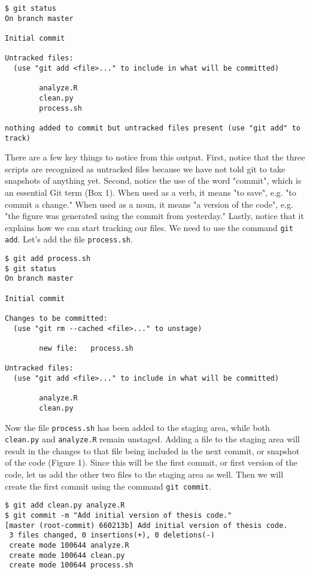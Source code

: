 \begin{lstlisting}
$ git status
On branch master

Initial commit

Untracked files:
  (use "git add <file>..." to include in what will be committed)

        analyze.R
        clean.py
        process.sh

nothing added to commit but untracked files present (use "git add" to track)
\end{lstlisting}

There are a few key things to notice from this output.
First, notice that the three scripts are recognized as untracked files because we have not told git to take snapshots of anything yet.
Second, notice the use of the word "commit", which is an essential Git term (Box 1).
When used as a verb, it means "to save", e.g. "to commit a change."
When used as a noun, it means "a version of the code", e.g. "the figure was generated using the commit from yesterday."
Lastly, notice that it explains how we can start tracking our files.
We need to use the command \verb|git add|.
Let's add the file \verb|process.sh|.

\begin{lstlisting}
$ git add process.sh
$ git status
On branch master

Initial commit

Changes to be committed:
  (use "git rm --cached <file>..." to unstage)

        new file:   process.sh

Untracked files:
  (use "git add <file>..." to include in what will be committed)

        analyze.R
        clean.py
\end{lstlisting}

Now the file \verb|process.sh| has been added to the staging area, while both \verb|clean.py| and \verb|analyze.R| remain unstaged.
Adding a file to the staging area will result in the changes to that file being included in the next commit, or snapshot of the code (Figure 1).
Since this will be the first commit, or first version of the code, let us add the other two files to the staging area as well.
Then we will create the first commit using the command \verb|git commit|.

\begin{lstlisting}
$ git add clean.py analyze.R
$ git commit -m "Add initial version of thesis code."
[master (root-commit) 660213b] Add initial version of thesis code.
 3 files changed, 0 insertions(+), 0 deletions(-)
 create mode 100644 analyze.R
 create mode 100644 clean.py
 create mode 100644 process.sh
\end{lstlisting}

